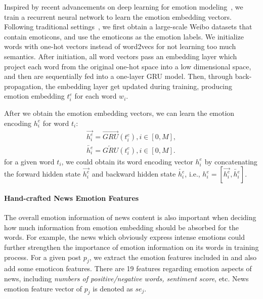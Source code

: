 \documentclass{article}
\newcommand{\kai}[1]{\textcolor{blue}{Kai: {#1}}}
\begin{document}
	Inspired by recent advancements on deep learning for emotion modeling~\cite{agrawal2018learning}, we train a recurrent neural network to learn the emotion embedding vectors. Following traditional settings~\cite{hu2013unsupervised}, we first obtain a large-scale Weibo datasets that contain emoticons, and use the emoticons as the emotion labels. We initialize words with one-hot vectors instead of word2vecs for not learning too much semantics. After initiation, all word vectors pass an embedding layer which project each word from the original one-hot space into a low dimensional space, and then are sequentially fed into a one-layer GRU model. Then, through back-propagation, the embedding layer get updated during training, producing emotion embedding $t_i^e$  for each word $w_i$.
	
	After we obtain the emotion embedding vectors, we can learn the emotion encoding $h_i^e$ for word $t_i$:
	\begin{equation}
	\begin{aligned}
	\overrightarrow{h_i^e} = \overrightarrow{GRU}(t_i^e), i \in [0, M],\\
	\overleftarrow{h_i^e} = \overleftarrow{GRU}(t_i^e), i\in [0, M].
	\end{aligned}
	\end{equation}%
	for a given word $t_i$, we could obtain its word encoding vector $h_i^e$ by concatenating the forward hidden state $\overrightarrow{h_i^e}$ and backward hidden state $\overleftarrow{h_i^e}$, i.e., $h_i^e=[\overrightarrow{h_i^e}, \overleftarrow{h_i^e}]$.
	
	
	\paragraph{Hand-crafted News Emotion Features}
	The overall emotion information of news content is also important when deciding how much information from emotion embedding should be absorbed for the words. For example, the news which obviously express intense emotions could further strengthen the importance of emotion information on its words in training process. For a given post $p_j$, we extract the emotion features included in \cite{castillo2011information} and also add some emoticon features. There are 19 features regarding emotion aspects of news, including {\em numbers of positive/negative words, sentiment score}, etc. News emotion feature vector of $p_j$ is denoted as $se_j$.
\end{document}
